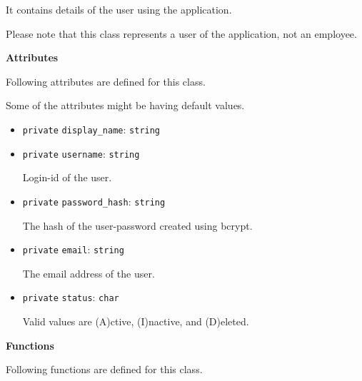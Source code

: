 \documentclass{article}%
\begin{document}
%
It contains details of the user using the application.%
\par%
Please note that this class represents a user of the application, not an employee.%
\par%
\vspace{0.25\baselineskip}%
\textbf{Attributes}%
\par%
Following attributes are defined for this class.%
\par%
Some of the attributes might be having default values.%
\begin{itemize}%
\item%
\verb|private| \verb|display_name|: \verb|string|%
\item%
\verb|private| \verb|username|: \verb|string|%
\par%
Login{-}id of the user.%
\item%
\verb|private| \verb|password_hash|: \verb|string|%
\par%
The hash of the user{-}password created using bcrypt.%
\item%
\verb|private| \verb|email|: \verb|string|%
\par%
The email address of the user.%
\item%
\verb|private| \verb|status|: \verb|char|%
\par%
Valid values are (A)ctive, (I)nactive, and (D)eleted.%
\end{itemize}%
\par%
\vspace{0.25\baselineskip}%
\textbf{Functions}%
\par%
Following functions are defined for this class.%
\end{document}
